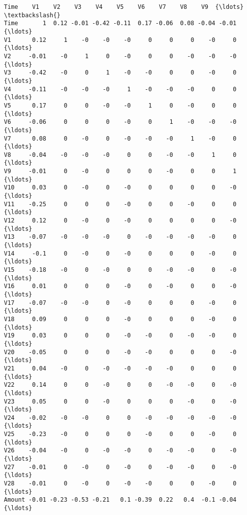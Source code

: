 \documentclass[11pt]{article}
\begin{document}
    \begin{Verbatim}[commandchars=\\\{\}]
        Time    V1    V2    V3    V4    V5    V6    V7    V8    V9  {\ldots}    \textbackslash{}
Time       1  0.12 -0.01 -0.42 -0.11  0.17 -0.06  0.08 -0.04 -0.01  {\ldots}     
V1      0.12     1    -0    -0    -0     0     0     0    -0     0  {\ldots}     
V2     -0.01    -0     1     0    -0     0     0    -0    -0    -0  {\ldots}     
V3     -0.42    -0     0     1    -0    -0     0     0    -0     0  {\ldots}     
V4     -0.11    -0    -0    -0     1    -0    -0    -0     0     0  {\ldots}     
V5      0.17     0     0    -0    -0     1     0    -0     0     0  {\ldots}     
V6     -0.06     0     0     0    -0     0     1    -0    -0    -0  {\ldots}     
V7      0.08     0    -0     0    -0    -0    -0     1    -0     0  {\ldots}     
V8     -0.04    -0    -0    -0     0     0    -0    -0     1     0  {\ldots}     
V9     -0.01     0    -0     0     0     0    -0     0     0     1  {\ldots}     
V10     0.03     0    -0     0    -0     0     0     0     0    -0  {\ldots}     
V11    -0.25     0     0     0    -0     0     0    -0     0     0  {\ldots}     
V12     0.12     0    -0     0    -0     0     0     0     0    -0  {\ldots}     
V13    -0.07    -0    -0    -0     0    -0    -0    -0    -0     0  {\ldots}     
V14     -0.1     0    -0     0    -0     0     0     0    -0     0  {\ldots}     
V15    -0.18    -0     0    -0     0     0    -0    -0     0    -0  {\ldots}     
V16     0.01     0     0     0    -0     0    -0     0     0    -0  {\ldots}     
V17    -0.07    -0    -0     0    -0     0     0     0    -0     0  {\ldots}     
V18     0.09     0     0     0    -0     0     0     0    -0     0  {\ldots}     
V19     0.03     0     0     0    -0    -0     0    -0    -0     0  {\ldots}     
V20    -0.05     0     0     0    -0    -0     0     0     0    -0  {\ldots}     
V21     0.04    -0     0    -0    -0    -0    -0     0     0     0  {\ldots}     
V22     0.14     0     0    -0     0     0    -0    -0     0    -0  {\ldots}     
V23     0.05     0     0    -0     0     0     0    -0     0    -0  {\ldots}     
V24    -0.02    -0    -0     0     0    -0    -0    -0    -0    -0  {\ldots}     
V25    -0.23    -0     0     0     0    -0     0     0    -0     0  {\ldots}     
V26    -0.04    -0     0    -0    -0     0    -0    -0     0    -0  {\ldots}     
V27    -0.01     0    -0     0    -0     0    -0    -0     0    -0  {\ldots}     
V28    -0.01     0    -0     0    -0    -0     0     0    -0     0  {\ldots}     
Amount -0.01 -0.23 -0.53 -0.21   0.1 -0.39  0.22   0.4  -0.1 -0.04  {\ldots}     


\end{Verbatim}
\end{document}
